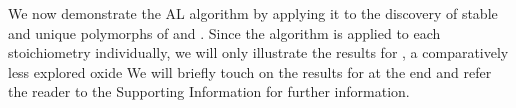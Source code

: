 %



%
We now demonstrate the AL algorithm by applying it to the discovery of stable and unique polymorphs of \IrOtwo and \IrOthree.
%
Since the algorithm is applied to each stoichiometry individually, we will only illustrate the results for \IrOthree, a comparatively less explored oxide
%
We will briefly touch on the results for \IrOtwo at the end and refer the reader to the Supporting Information for further information.


